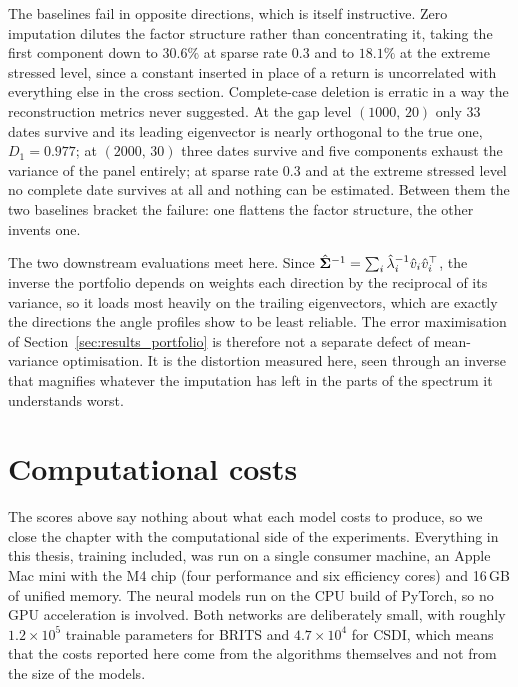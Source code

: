 The baselines fail in opposite directions, which is itself instructive. Zero
imputation dilutes the factor structure rather than concentrating it, taking
the first component down to $30.6\%$ at sparse rate $0.3$ and to $18.1\%$ at the
extreme stressed level, since a constant inserted in place of a return is
uncorrelated with everything else in the cross section. Complete-case deletion
is erratic in a way the reconstruction metrics never suggested. At the gap level
$(1000,\,20)$ only $33$ dates survive and its leading eigenvector is nearly
orthogonal to the true one, $D_1 = 0.977$; at $(2000,\,30)$ three dates survive
and five components exhaust the variance of the panel entirely; at sparse rate
$0.3$ and at the extreme stressed level no complete date survives at all and
nothing can be estimated. Between them the two baselines bracket the failure:
one flattens the factor structure, the other invents one.

The two downstream evaluations meet here. Since
$\hat{\boldsymbol{\Sigma}}^{-1} = \sum_i \hat\lambda_i^{-1} \hat v_i \hat v_i^\top$, the
inverse the portfolio depends on weights each direction by the reciprocal of its
variance, so it loads most heavily on the trailing eigenvectors, which are
exactly the directions the angle profiles show to be least reliable. The error
maximisation of Section~\ref{sec:results_portfolio} is therefore not a separate
defect of mean-variance optimisation. It is the distortion measured here, seen
through an inverse that magnifies whatever the imputation has left in the parts
of the spectrum it understands worst.

\section{Computational costs}
\label{sec:costs}

The scores above say nothing about what each model costs to produce, so we
close the chapter with the computational side of the experiments.
Everything in this thesis, training included, was run on a single consumer
machine, an Apple Mac mini with the M4 chip (four performance and six
efficiency cores) and 16\,GB of unified memory. The neural models run on
the CPU build of PyTorch, so no GPU acceleration is involved. Both
networks are deliberately small, with roughly $1.2 \times 10^{5}$
trainable parameters for BRITS and $4.7 \times 10^{4}$ for CSDI, which
means that the costs reported here come from the algorithms themselves and
not from the size of the models.

